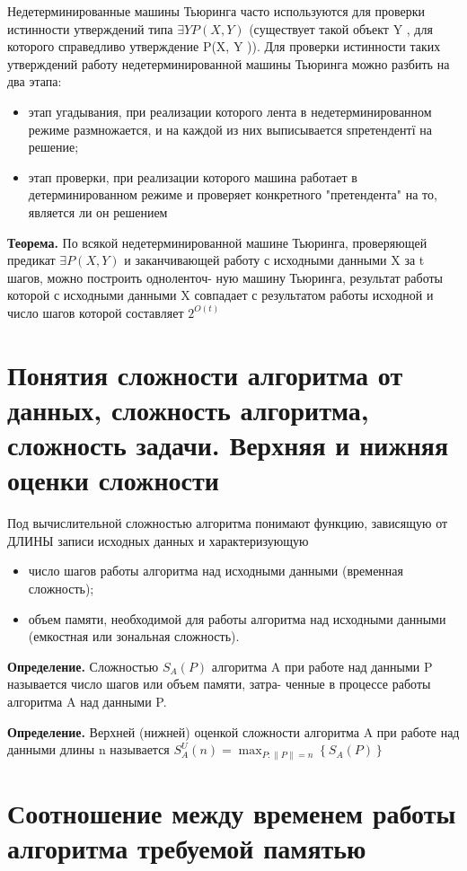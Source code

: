 \documentclass[40pt]{article}
\begin{document}
Недетерминированные машины Тьюринга часто используются
для проверки истинности утверждений типа $\exists Y P(X, Y )$ (существует такой объект Y , для которого справедливо утверждение P(X, Y )).
Для проверки истинности таких утверждений работу недетерминированной машины Тьюринга можно разбить на два этапа:
\begin{itemize}
    \item этап угадывания, при реализации которого лента в недетерминированном режиме размножается, и на каждой из них выписывается ѕпретендентї на решение;
    \item этап проверки, при реализации которого машина работает в
детерминированном режиме и проверяет конкретного "претендента"
на то, является ли он решением
\end{itemize}

\textbf{Теорема.} По всякой недетерминированной машине Тьюринга, проверяющей предикат $\exists P(X, Y )$ и заканчивающей работу с
исходными данными X за t шагов, можно построить одноленточ-
ную машину Тьюринга, результат работы которой с исходными
данными X совпадает с результатом работы исходной и число шагов которой составляет $2^{O(t)}$

\section{Понятия сложности алгоритма от данных, сложность алгоритма, сложность задачи. Верхняя и нижняя оценки сложности}

Под вычислительной сложностью алгоритма понимают функцию, зависящую от ДЛИНЫ записи исходных данных и характеризующую
\begin{itemize}
    \item число шагов работы алгоритма над исходными данными (временная сложность);
    \item объем памяти, необходимой для работы алгоритма над исходными данными (емкостная или зональная сложность).
\end{itemize} 

\textbf{Определение.} Сложностью $S_A(P)$ алгоритма A при работе
над данными P называется число шагов или объем памяти, затра-
ченные в процессе работы алгоритма A над данными P.

\textbf{Определение.} Верхней (нижней) оценкой сложности алгоритма A при работе над данными длины n называется $S_{A}^{U}(n)=\max _{P:\|P\|=n}\left\{S_{A}(P)\right\}$
\section{Соотношение между временем работы алгоритма требуемой памятью}
\end{document}
